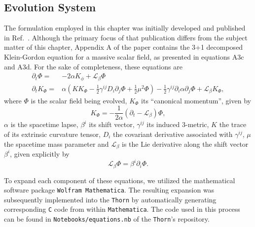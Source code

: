 \subsection{Evolution System}

The formulation employed in this chapter was initially developed and published in Ref.~\cite{PhysRevD.96.104040}. Although the primary focus of that publication differs from the subject matter of this chapter, Appendix A of the paper contains the 3+1 decomposed Klein-Gordon equation for a massive scalar field, as presented in equations A3c and A3d. For the sake of completeness, these equations are
%
\begin{align}
  \partial_t \Phi =   & -2 \alpha K_\phi + \mathcal{L}_\beta \Phi \label{eq:wave_scattering_a3c}                                                                                                                                                     \\
  \partial_t K_\Phi = & \alpha \left( K K_\Phi - \frac{1}{2} \gamma^{ij} D_i \partial_j \Phi + \frac{1}{2} \mu^2 \Phi \right) - \frac{1}{2} \gamma^{ij} \partial_i \alpha \partial_j \Phi + \mathcal{L}_\beta K_\Phi, \label{eq:wave_scattering_a3d}
\end{align}
%
where $\Phi$ is the scalar field being evolved, $K_\Phi$ its ``canonical momentum'', given by
%
\begin{equation}
  K_\Phi = -\frac{1}{2\alpha} \left( \partial_t - \mathcal{L}_\beta \right)\Phi,
  \label{eq:wave_scattering_a2}
\end{equation}
%
$\alpha$ is the spacetime lapse, $\beta^i$ its shift vector, $\gamma^{ij}$ its induced 3-metric, $K$ the trace of its extrinsic curvature tensor, $D_i$ the covariant derivative associated with $\gamma^{ij}$, $\mu$ the spacetime mass parameter and $\mathcal{L}_\beta$ is the Lie derivative along the shift vector $\beta^i$, given explicitly by
%
\begin{equation}
  \mathcal{L}_\beta\Phi = \beta^i \partial_i \Phi.
  \label{eq:wave_scattering_lie_derivative}
\end{equation}

To expand each component of these equations, we utilized the mathematical software package \texttt{Wolfram Mathematica}. The resulting expansion was subsequently implemented into the \texttt{Thorn} by automatically generating corresponding \texttt{C} code from within \texttt{Mathematica}. The code used in this process can be found in \texttt{Notebooks/equations.nb} of the \texttt{Thorn}'s repository.

